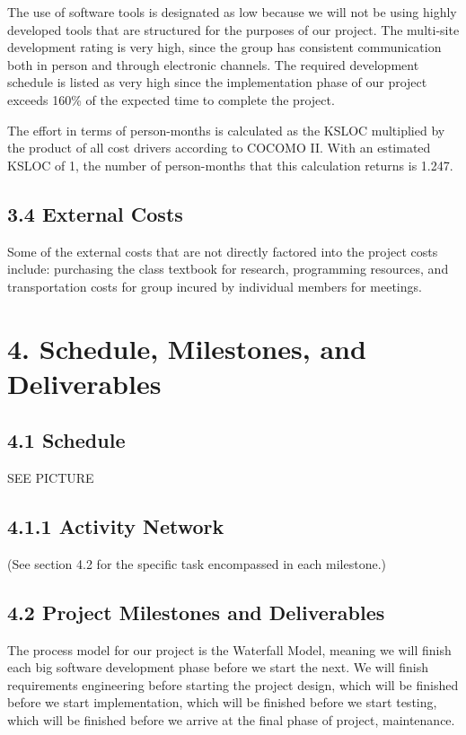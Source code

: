 \documentclass[]{article}
\begin{document}
The use of software tools is designated as low because we will not be
using highly developed tools that are structured for the purposes of our
project. The multi-site development rating is very high, since the group
has consistent communication both in person and through electronic
channels. The required development schedule is listed as very high since
the implementation phase of our project exceeds 160\% of the expected
time to complete the project.

The effort in terms of person-months is calculated as the KSLOC
multiplied by the product of all cost drivers according to COCOMO II.
With an estimated KSLOC of 1, the number of person-months that this
calculation returns is 1.247.

\subsection{3.4 External Costs}\label{external-costs}

Some of the external costs that are not directly factored into the
project costs include: purchasing the class textbook for research,
programming resources, and transportation costs for group incured by
individual members for meetings.

\section{4. Schedule, Milestones, and
Deliverables}\label{schedule-milestones-and-deliverables}

\subsection{4.1 Schedule}\label{schedule}

SEE PICTURE

\subsection{4.1.1 Activity Network}\label{activity-network}

(See section 4.2 for the specific task encompassed in each milestone.)

\subsection{4.2 Project Milestones and
Deliverables}\label{project-milestones-and-deliverables}

The process model for our project is the Waterfall Model, meaning we
will finish each big software development phase before we start the
next. We will finish requirements engineering before starting the
project design, which will be finished before we start implementation,
which will be finished before we start testing, which will be finished
before we arrive at the final phase of project, maintenance.
\end{document}
